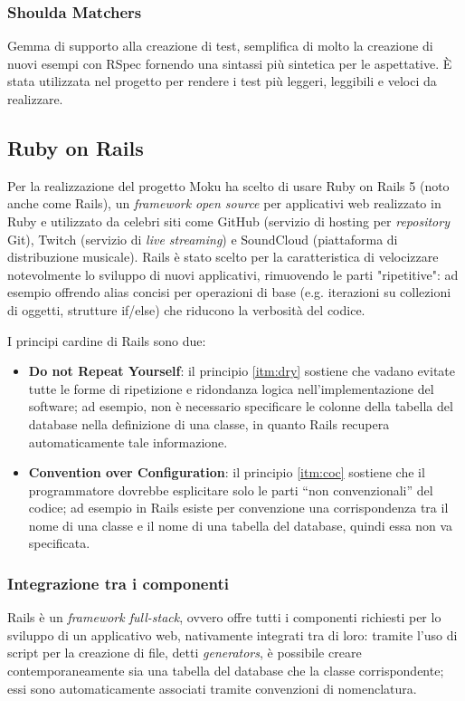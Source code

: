 \subsubsection{Shoulda Matchers}
Gemma di supporto alla creazione di test, semplifica di molto la creazione di nuovi esempi con RSpec fornendo una sintassi più sintetica per le aspettative. È stata utilizzata nel progetto per rendere i test più leggeri, leggibili e veloci da realizzare.


\subsection{Ruby on Rails}
\label{sec:2.2.3}
Per la realizzazione del progetto Moku ha scelto di usare Ruby on Rails 5 (noto anche come Rails), un \textit{framework} \textit{open source} per applicativi web realizzato in Ruby e utilizzato da celebri siti come GitHub (servizio di hosting per \textit{repository} Git), Twitch (servizio di \textit{live streaming}) e SoundCloud (piattaforma di distribuzione musicale). Rails è stato scelto per la caratteristica di velocizzare notevolmente lo sviluppo di nuovi applicativi, rimuovendo le parti "ripetitive": ad esempio offrendo alias concisi per operazioni di base (e.g. iterazioni su collezioni di oggetti, strutture if/else) che riducono la verbosità del codice.

I principi cardine di Rails sono due:
\begin{itemize}
    \item\textbf{Do not Repeat Yourself}: il principio \ref{itm:dry} sostiene che vadano evitate tutte le forme di ripetizione e ridondanza logica nell'implementazione del software; ad esempio, non è necessario specificare le colonne della tabella del database nella definizione di una classe, in quanto Rails recupera automaticamente tale informazione.
    \item\textbf{Convention over Configuration}: il principio \ref{itm:coc} sostiene che il programmatore dovrebbe esplicitare solo le parti ``non convenzionali'' del codice; ad esempio in Rails esiste per convenzione una corrispondenza tra il nome di una classe e il nome di una tabella del database, quindi essa non va specificata.
\end{itemize}
\vspace{-25pt}
\subsubsection{Integrazione tra i componenti}
Rails è un \textit{framework full-stack}, ovvero offre tutti i componenti richiesti per lo sviluppo di un applicativo web, nativamente integrati tra di loro: tramite l'uso di script per la creazione di file, detti \textit{generators}, è possibile creare contemporaneamente sia una tabella del database che la classe corrispondente; essi sono automaticamente associati tramite convenzioni di nomenclatura. 

